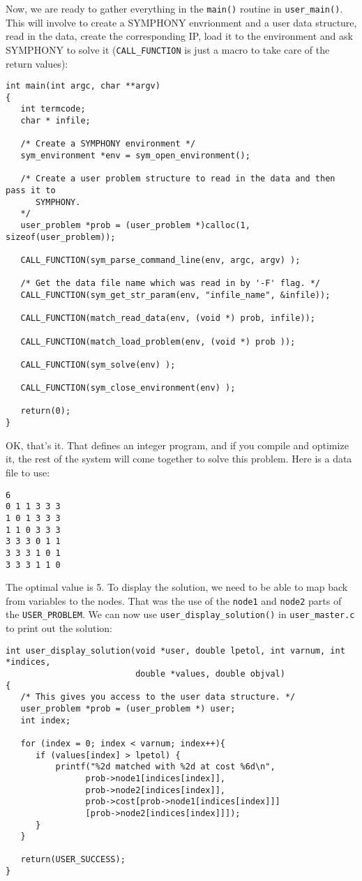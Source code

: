 \documentclass[11pt]{article}
\begin{document}
Now, we are ready to gather everything in the \texttt{main()} routine in 
\texttt{user\_main()}. This will involve to create a SYMPHONY envrionment and 
a user data structure, read in the data, create the corresponding IP, 
load it to the environment and ask SYMPHONY to solve it 
(\texttt{CALL\_FUNCTION} is just a macro to take care of the return values):  

\begin{verbatim}
int main(int argc, char **argv)
{
   int termcode;
   char * infile;

   /* Create a SYMPHONY environment */
   sym_environment *env = sym_open_environment();

   /* Create a user problem structure to read in the data and then pass it to  
      SYMPHONY. 
   */
   user_problem *prob = (user_problem *)calloc(1, sizeof(user_problem));

   CALL_FUNCTION(sym_parse_command_line(env, argc, argv) );

   /* Get the data file name which was read in by '-F' flag. */
   CALL_FUNCTION(sym_get_str_param(env, "infile_name", &infile));

   CALL_FUNCTION(match_read_data(env, (void *) prob, infile));

   CALL_FUNCTION(match_load_problem(env, (void *) prob ));

   CALL_FUNCTION(sym_solve(env) );

   CALL_FUNCTION(sym_close_environment(env) );

   return(0);
}
\end{verbatim}

OK, that's it. That defines an integer program, and if you compile and
optimize it, the rest of the system will come together to solve this problem.
Here is a data file to use:
\begin{verbatim}
6
0 1 1 3 3 3
1 0 1 3 3 3
1 1 0 3 3 3
3 3 3 0 1 1
3 3 3 1 0 1
3 3 3 1 1 0
\end{verbatim}

The optimal value is 5. To display the solution, we need to be able to map
back from variables to the nodes. That was the use of the \texttt{node1} and
\texttt{node2} parts of the \texttt{USER\_PROBLEM}. We can now use
\texttt{user\_display\_solution()} in \texttt{user\_master.c} to print 
out the solution:

\begin{verbatim}
int user_display_solution(void *user, double lpetol, int varnum, int *indices,
                          double *values, double objval)
{
   /* This gives you access to the user data structure. */
   user_problem *prob = (user_problem *) user;
   int index;
 
   for (index = 0; index < varnum; index++){
      if (values[index] > lpetol) {
          printf("%2d matched with %2d at cost %6d\n",
                prob->node1[indices[index]],
                prob->node2[indices[index]],
                prob->cost[prob->node1[indices[index]]]
                [prob->node2[indices[index]]]);
      }	   
   }
   
   return(USER_SUCCESS);
}
\end{verbatim}
\end{document}
